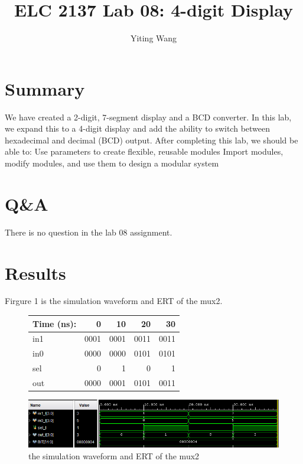 \documentclass[11pt]{article}
\begin{document}
\title{ELC 2137 Lab 08: 4-digit Display}
\author{Yiting Wang}

\maketitle


\section*{Summary}

We have created a 2-digit, 7-segment display and a BCD converter. In this lab, we expand this to a 4-digit display and add the ability to switch between hexadecimal and decimal (BCD) output. After completing this lab, we should be able to:
Use parameters to create flexible, reusable modules
Import modules, modify modules, and use them to design a modular system



\section*{Q\&A}

There is no question in the lab 08 assignment.



\section*{Results}

	Firgure 1 is the simulation waveform and ERT of the mux2.
    \begin{figure}[ht]\centering
        \begin{tabular}{l|rrrr}
            Time (ns): & 0 & 10 & 20 & 30 \\
            \midrule
            in1 & 0001 & 0001 & 0011 & 0011 \\
            in0 & 0000 & 0000 & 0101 & 0101 \\
            sel & 0 & 1 & 0 & 1 \\
            \midrule
            out & 0000 & 0001 & 0101 & 0011\\
            \bottomrule
        \end{tabular}\medskip

        \includegraphics[width=1\textwidth]{mux2_simulation}
        \caption{the simulation waveform and ERT of the mux2}
        \label{fig:mux2_simulation}
    \end{figure}
\end{document}
